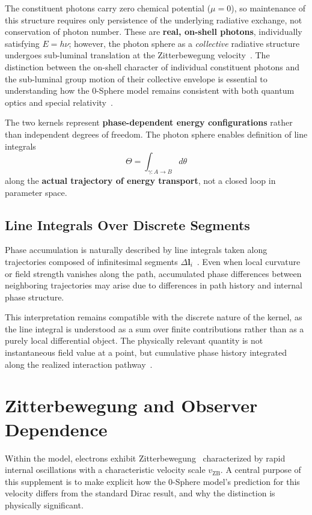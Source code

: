 \documentclass[12pt,letterpaper]{article}
\begin{document}
The constituent photons carry zero chemical potential ($\mu = 0$), so maintenance of this structure requires only persistence of the underlying radiative exchange, not conservation of photon number. These are \textbf{real, on-shell photons}, individually satisfying $E = h\nu$; however, the photon sphere as a \emph{collective} radiative structure undergoes sub-luminal translation at the Zitterbewegung velocity~\cite{hanamura18356895}. The distinction between the on-shell character of individual constituent photons and the sub-luminal group motion of their collective envelope is essential to understanding how the 0-Sphere model remains consistent with both quantum optics and special relativity~\cite{hanamura18511664}.

The two kernels represent \textbf{phase-dependent energy configurations} rather than independent degrees of freedom. The photon sphere enables definition of line integrals~\cite{hanamura18203433}
\begin{equation}
\Theta = \int_{\gamma: A \to B} d\theta
\end{equation}
along the \textbf{actual trajectory of energy transport}, not a closed loop in parameter space.

\subsection{Line Integrals Over Discrete Segments}

Phase accumulation is naturally described by line integrals taken along trajectories composed of infinitesimal segments $\Delta \mathbf{l}_i$~\cite{hanamura18203433}. Even when local curvature or field strength vanishes along the path, accumulated phase differences between neighboring trajectories may arise due to differences in path history and internal phase structure.

This interpretation remains compatible with the discrete nature of the kernel, as the line integral is understood as a sum over finite contributions rather than as a purely local differential object. The physically relevant quantity is not instantaneous field value at a point, but cumulative phase history integrated along the realized interaction pathway~\cite{hanamura18067760}.


\section{Zitterbewegung and Observer Dependence}

\justifying
Within the model, electrons exhibit Zitterbewegung~\cite{Schrodinger1930} characterized by rapid internal oscillations with a characteristic velocity scale $v_{\mathrm{ZB}}$. A central purpose of this supplement is to make explicit how the 0-Sphere model's prediction for this velocity differs from the standard Dirac result, and why the distinction is physically significant.
\end{document}
